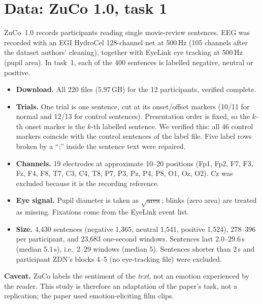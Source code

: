 \documentclass[10pt,a4paper]{article}
\begin{document}
\section{Data: ZuCo 1.0, task 1}
ZuCo~1.0 records participants reading single movie-review sentences. EEG was recorded with an EGI HydroCel 128-channel net at 500\,Hz (105 channels after the dataset authors' cleaning), together with EyeLink eye tracking at 500\,Hz (pupil area). In task~1, each of the 400 sentences is labelled negative, neutral or positive.
\begin{itemize}
  \item \textbf{Download.} All 220 files (5.97\,GB) for the 12 participants, verified complete.
  \item \textbf{Trials.} One trial is one sentence, cut at its onset/offset markers (10/11 for normal and 12/13 for control sentences). Presentation order is fixed, so the $k$-th onset marker is the $k$-th labelled sentence. We verified this: all 46 control markers coincide with the control sentences of the label file. Five label rows broken by a ``;'' inside the sentence text were repaired.
  \item \textbf{Channels.} 19 electrodes at approximate 10--20 positions (Fp1, Fp2, F7, F3, Fz, F4, F8, T7, C3, C4, T8, P7, P3, Pz, P4, P8, O1, Oz, O2). Cz was excluded because it is the recording reference.
  \item \textbf{Eye signal.} Pupil diameter is taken as $\sqrt{\text{area}}$; blinks (zero area) are treated as missing. Fixations come from the EyeLink event list.
  \item \textbf{Size.} 4{,}430 sentences (negative 1{,}365, neutral 1{,}541, positive 1{,}524), 278--396 per participant, and 23{,}683 one-second windows. Sentences last 2.0--29.6\,s (median 5.1\,s), i.e.\ 2--29 windows (median 5). Sentences shorter than 2\,s and participant ZDN's blocks 4--5 (no eye-tracking file) were excluded.
\end{itemize}
\textbf{Caveat.} ZuCo labels the sentiment of the \emph{text}, not an emotion experienced by the reader. This study is therefore an adaptation of the paper's task, not a replication; the paper used emotion-eliciting film clips.
\end{document}
